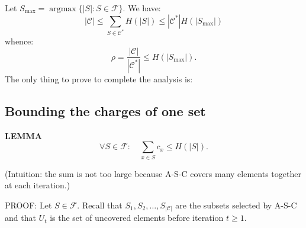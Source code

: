 Let $S_{\max}=\operatorname{argmax}\{|S|:S\in\mathcal F\}$.
We have:
\[|\mathcal C|\leq\sum_{S\in\mathcal C^*}H(|S|)
\leq|\mathcal C^*|H(|S_{\max}|)\]
whence:
\[\rho=\frac{|\mathcal C|}{|\mathcal C^*|}\leq H(|S_{\max}|).\]
The only thing to prove to complete the analysis is:
\subsection{Bounding the charges of one set}
\begin{notesresult}
\textbf{LEMMA}
\[\forall S\in\mathcal F:\quad\sum_{x\in S}c_x\leq H(|S|).\]
\end{notesresult}
(Intuition: the sum is not too large because A-S-C covers many elements together at each iteration.)

PROOF: Let $S\in\mathcal F$.
Recall that $S_1,S_2,\ldots,S_{|\mathcal C|}$ are the subsets selected by A-S-C and that $U_t$ is the set of uncovered elements before iteration $t\geq1$.

